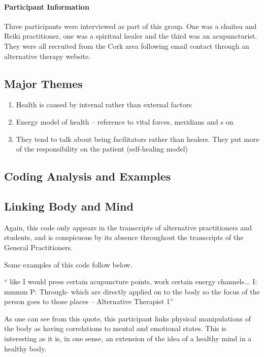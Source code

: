 \paragraph{Participant Information}

Three participants were interviewed as part of this group. One was a shaitsu and Reiki practitioner, one was a spiritual healer and the third was an acupuncturist. They were all recruited from the Cork area following email contact through an alternative therapy website. 

\subsection{Major Themes}
\begin{enumerate}
\item Health is caused by internal rather than external factors
\item Energy model of health – reference to vital forces, meridians and s on
\item They tend to talk about being facilitators rather than healers. They put more of the responsibility on the patient (self-healing model)
\end{enumerate}

\subsection{Coding Analysis and Examples}



\subsection{Linking Body and Mind}

Again, this code only appears in the transcripts of alternative practitioners and students, and is conspicuous by its absence throughout the transcripts of the General Practitioners. 

Some examples of this code follow below. 

`` like I would press certain acupuncture points, work certain energy channels...
I: mmmm
P: Through- which are directly applied on to the body so the focus of the person goes to those places – Alternative Therapist 1''

As one can see from this quote, this participant links physical manipulations of the body as having correlations to mental and emotional states. This is interesting as it is, in one sense, an extension of the idea of a healthy mind in a healthy body. 

